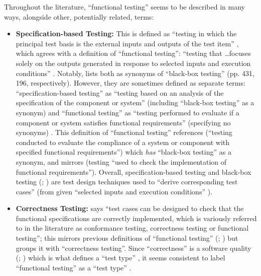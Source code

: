 Throughout the literature, ``functional testing'' seems to be described in many
ways, alongside other, potentially related, terms:

\begin{itemize}
      \item \textbf{Specification-based Testing:} This is defined as ``testing
            in which the principal test basis is the external inputs and
            outputs of the test item'' \citep[p.~9]{IEEE2022}, which agrees
            with a definition of ``functional testing'': ``testing that
            \dots focuses solely on the outputs generated in response to
            selected inputs and execution conditions'' \citep[p.~196]{IEEE2017}.
            Notably, \citet{IEEE2017} lists both as synonyms of
            ``black-box testing'' (pp. 431, 196, respectively). However,
            they are sometimes defined as separate terms: ``specification-based
            testing'' as ``testing based on an analysis of the specification
            of the component or system'' (including ``black-box testing'' as a
            synonym) and ``functional testing'' as ``testing performed to
            evaluate if a component or system satisfies functional
            requirements'' (specifying no synonyms) . This
            definition of
            ``functional testing'' references \citet[p.~196]{IEEE2017}
            (``testing conducted to evaluate the compliance of a system or
            component with specified functional requirements'') which
            \emph{has} ``black-box testing'' as a synonym, and mirrors
            \citet[p.~21]{IEEE2022} (testing ``used to check the implementation
            of functional requirements''). Overall, specification-based testing
            \citep[pp.~2-4, 6-9, 22]{IEEE2022} and black-box testing
            (\citealp[p.~5-10]{SWEBOK2024}; \citealp[p.~3]{SouzaEtAl2017})
            are test design techniques used to ``derive corresponding test cases''
            \citep[p.~11]{IEEE2022} (from given ``selected inputs and execution
            conditions'' \citep[p.~196]{IEEE2017}).

      \item \textbf{Correctness Testing:} \citet[p.~5-7]{SWEBOK2024} says
            ``test cases can be designed to check that the functional
            specifications are correctly implemented, which is variously
            referred to in the literature as conformance testing, correctness
            testing or functional testing''; this mirrors previous definitions
            of ``functional testing'' (\citealp[p.~21]{IEEE2022};
            \citeyear[p.~196]{IEEE2017}) but groups it with ``correctness
            testing''. Since ``correctness'' is a software quality
            (\citealp[p.~104]{IEEE2017}; \citealp[p.~3-13]{SWEBOK2024}) which is
            what defines a ``test type'' \citep[p.~15]{IEEE2022}, it seems
            consistent to label ``functional testing'' as a ``test type''
            \citep[pp.~15, 20, 22]{IEEE2022}.


\end{itemize}
